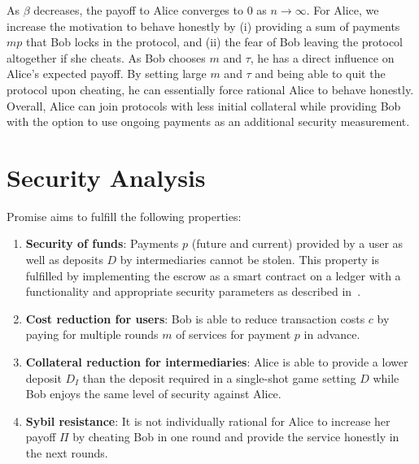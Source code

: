 \documentclass[runningheads]{llncs}
\newcommand{\sys}{Promise\xspace}
\begin{document}
As $\beta$ decreases, the payoff to Alice converges to $0$ as $n \rightarrow \infty$.
For Alice, we increase the motivation to behave honestly by (i) providing a sum of payments $mp$ that Bob locks in the protocol, and (ii) the fear of Bob leaving the protocol altogether if she cheats. %
As Bob chooses $m$ and $\tau$, he has a direct influence on Alice's expected payoff.
By setting large $m$ and $\tau$ and being able to quit the protocol upon cheating, he can essentially force rational Alice to behave honestly.
Overall, Alice can join protocols with less initial collateral while providing Bob with the option to use ongoing payments as an additional security measurement.




\section{Security Analysis}
\label{sec:security}

\sys aims to fulfill the following properties:

\begin{enumerate}
    \item \textbf{Security of funds}: Payments $p$ (future and current) provided by a user as well as deposits $D$ by intermediaries cannot be stolen. This property is fulfilled by implementing the escrow as a smart contract on a ledger with a functionality and appropriate security parameters as described in~\cite{garay2016bitcoin,gervais2016security}. 
    \item \textbf{Cost reduction for users}: Bob is able to reduce transaction costs $c$ by paying for multiple rounds $m$ of services for payment $p$ in advance.
    \item \textbf{Collateral reduction for intermediaries}: Alice is able to provide a lower deposit $D_I$ than the deposit required in a single-shot game setting $D$ while Bob enjoys the same level of security against Alice.
    \item \textbf{Sybil resistance}: It is not individually rational for Alice to increase her payoff $\Pi$ by cheating Bob in one round and provide the service honestly in the next rounds.
\end{enumerate}
\end{document}
